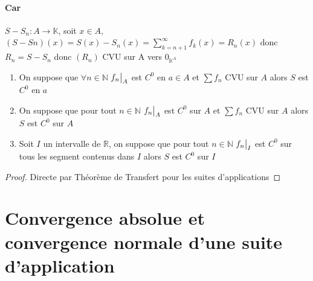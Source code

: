 \documentclass[11pt,hidelinks]{book}
\theoremstyle{mytheoremstyle}
\theoremstyle{mytheoremstyle}
\theoremstyle{mytheoremstyle}
\theoremstyle{mytheoremstyle}
\theoremstyle{mytheoremstyle}
\theoremstyle{mytheoremstyle}
\theoremstyle{mytheoremstyle}
\theoremstyle{mytheoremstyle}
\theoremstyle{myproblemstyle}
\def\mbb#1{\mathbb{#1}}
\def\bN{\mbb{N}}
\def\bR{\mbb{R}}
\def\bK{\mbb{K}}
\newcommand\restr[2]{{%
  \left.\kern-\nulldelimiterspace %
  #1 %
  \vphantom{\big|} %
  \right|_{#2} %
  }}
\begin{document}
\begin{adjustwidth}{-2em}{-1em}
\begin{theorem}
\begin{ef}
            \paragraph*{Car} 
            $S - S_n \colon A \to \bK$, soit $x \in A$,  $(S-Sn)(x) = S(x) - S_n(x) = \sum_{k=n+1}^{\infty} f_k(x) = R_n(x)$
            donc $R_n = S - S_n$
            donc $(R_n)$ CVU sur A vers $0_{\bK^{A}}$
        \end{ef}
    \end{theorem}
    \begin{theorem}
        \begin{enumerate}
        \item On suppose que $\forall n \in \bN$ $\restr{f_n}{A}$ est $C^0$ en $a \in A$ et $\sum f_n$ CVU sur $A$ alors $S$ est $C^0$ en $a$
        
        \item On suppose que pour tout $n \in \bN$ $\restr{f_n}{A}$ est $C^0$ sur $A$ et $\sum f_n$ CVU sur $A$ alors $S$ est $C^0$ sur $A$
        
        \item Soit $I$ un intervalle de $\bR$, on suppose que pour tout $n \in \bN$ $\restr{f_n}{I}$ est $C^0$ sur tous les segment contenus dans $I$ alors $S$ est $C^0$ sur $I$
        \end{enumerate}

        \begin{proof}
            Directe par Théorème de Transfert pour les suites d'applications
        \end{proof}
          
    \end{theorem}
\end{adjustwidth}
\section{Convergence absolue et convergence normale d'une suite d'application}
\end{document}
